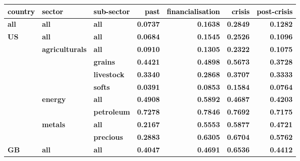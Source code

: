 \documentclass[
  authoryear,
  preprint,
  3p]{elsarticle}
\begin{document}
\begin{longtable}[t]{>{}l>{}l>{}l>{}r>{}r>{}r>{}r}
\toprule
\textcolor{black}{\textbf{country}} & \textcolor{black}{\textbf{sector}} & \textcolor{black}{\textbf{sub-sector}} & \textcolor{black}{\textbf{past}} & \textcolor{black}{\textbf{financialisation}} & \textcolor{black}{\textbf{crisis}} & \textcolor{black}{\textbf{post-crisis}}\\
\midrule
\textbf{all} & \textbf{all} & \textbf{all} & \textcolor[HTML]{4285f4}{\textbf{0.0737}} & \textcolor[HTML]{4285f4}{\textbf{0.1638}} & \textcolor[HTML]{4285f4}{\textbf{0.2849}} & \textcolor[HTML]{4285f4}{\textbf{0.1282}}\\
\textbf{US} & \textbf{all} & \textbf{all} & \textcolor[HTML]{4285f4}{\textbf{0.0684}} & \textcolor[HTML]{4285f4}{\textbf{0.1545}} & \textcolor[HTML]{4285f4}{\textbf{0.2526}} & \textcolor[HTML]{4285f4}{\textbf{0.1096}}\\
\textbf{} & \textbf{agriculturals} & \textbf{all} & \textcolor[HTML]{4285f4}{\textbf{0.0910}} & \textcolor[HTML]{4285f4}{\textbf{0.1305}} & \textcolor[HTML]{4285f4}{\textbf{0.2322}} & \textcolor[HTML]{4285f4}{\textbf{0.1075}}\\
\textbf{} & \textbf{} & \textbf{grains} & \textcolor[HTML]{4285f4}{\textbf{0.4421}} & \textcolor[HTML]{4285f4}{\textbf{0.4898}} & \textcolor[HTML]{4285f4}{\textbf{0.5673}} & \textcolor[HTML]{4285f4}{\textbf{0.3728}}\\
\textbf{} & \textbf{} & \textbf{livestock} & \textcolor[HTML]{4285f4}{\textbf{0.3340}} & \textcolor[HTML]{4285f4}{\textbf{0.2868}} & \textcolor[HTML]{4285f4}{\textbf{0.3707}} & \textcolor[HTML]{4285f4}{\textbf{0.3333}}\\
\addlinespace
\textbf{} & \textbf{} & \textbf{softs} & \textcolor[HTML]{4285f4}{\textbf{0.0391}} & \textcolor[HTML]{4285f4}{\textbf{0.0853}} & \textcolor[HTML]{4285f4}{\textbf{0.1584}} & \textcolor[HTML]{4285f4}{\textbf{0.0764}}\\
\textbf{} & \textbf{energy} & \textbf{all} & \textcolor[HTML]{4285f4}{\textbf{0.4908}} & \textcolor[HTML]{4285f4}{\textbf{0.5892}} & \textcolor[HTML]{4285f4}{\textbf{0.4687}} & \textcolor[HTML]{4285f4}{\textbf{0.4203}}\\
\textbf{} & \textbf{} & \textbf{petroleum} & \textcolor[HTML]{4285f4}{\textbf{0.7278}} & \textcolor[HTML]{4285f4}{\textbf{0.7846}} & \textcolor[HTML]{4285f4}{\textbf{0.7692}} & \textcolor[HTML]{4285f4}{\textbf{0.7175}}\\
\textbf{} & \textbf{metals} & \textbf{all} & \textcolor[HTML]{4285f4}{\textbf{0.2167}} & \textcolor[HTML]{4285f4}{\textbf{0.5553}} & \textcolor[HTML]{4285f4}{\textbf{0.5877}} & \textcolor[HTML]{4285f4}{\textbf{0.4721}}\\
\textbf{} & \textbf{} & \textbf{precious} & \textcolor[HTML]{4285f4}{\textbf{0.2883}} & \textcolor[HTML]{4285f4}{\textbf{0.6305}} & \textcolor[HTML]{4285f4}{\textbf{0.6704}} & \textcolor[HTML]{4285f4}{\textbf{0.5762}}\\
\addlinespace
\textbf{GB} & \textbf{all} & \textbf{all} & \textcolor[HTML]{4285f4}{\textbf{0.4047}} & \textcolor[HTML]{4285f4}{\textbf{0.4691}} & \textcolor[HTML]{4285f4}{\textbf{0.6536}} & \textcolor[HTML]{4285f4}{\textbf{0.4412}}\\
\bottomrule


\end{longtable}
\end{document}
